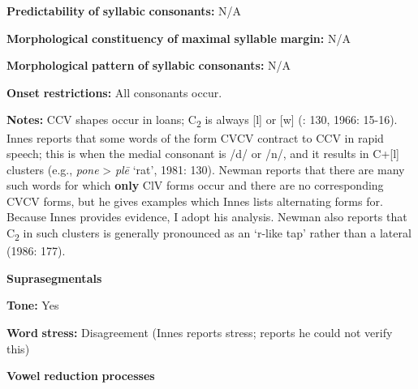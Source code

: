\documentclass[output=paper]{langsci/langscibook}
\begin{document}
\begin{styleBody}
\textbf{Predictability} \textbf{of} \textbf{syllabic} \textbf{consonants:} N/A
\end{styleBody}

\begin{styleBody}
\textbf{Morphological} \textbf{constituency} \textbf{of} \textbf{maximal} \textbf{syllable} \textbf{margin:} N/A
\end{styleBody}

\begin{styleBody}
\textbf{Morphological} \textbf{pattern} \textbf{of} \textbf{syllabic} \textbf{consonants:} N/A
\end{styleBody}

\begin{styleBody}
\textbf{Onset} \textbf{restrictions:} All consonants occur.
\end{styleBody}

\begin{styleBody}
\textbf{Notes:} CCV shapes occur in loans; C\textsubscript{2} is always [l] or [w] (\citealt{Innes1981}: 130, 1966: 15-16). Innes reports that some words of the form CVCV contract to CCV in rapid speech; this is when the medial consonant is /d/ or /n/, and it results in C+[l] clusters (e.g., \textit{pone} > \textit{plē} ‘rat’, 1981: 130). Newman reports that there are many such words for which \textbf{only} ClV forms occur and there are no corresponding CVCV forms, but he gives examples which Innes lists alternating forms for. Because Innes provides evidence, I adopt his analysis. Newman also reports that C\textsubscript{2} in such clusters is generally pronounced as an ‘r-like tap’ rather than a lateral (1986: 177).
\end{styleBody}

\begin{styleBody}
\textbf{Suprasegmentals}
\end{styleBody}

\begin{styleBody}
\textbf{Tone:} Yes
\end{styleBody}

\begin{styleBody}
\textbf{Word} \textbf{stress:} Disagreement (Innes reports stress; \citealt{Newman1986} reports he could not verify this)
\end{styleBody}

\begin{styleBody}
\textbf{Vowel} \textbf{reduction} \textbf{processes}
\end{styleBody}
\end{document}
